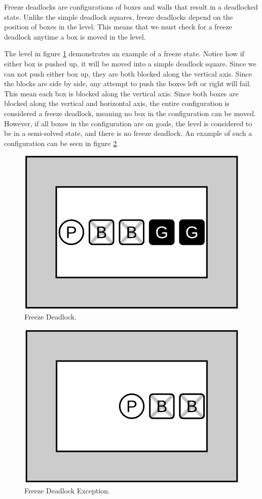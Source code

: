 \documentclass[times, 10pt,twocolumn]{article}
\begin{document}

Freeze deadlocks are configurations of boxes and walls that result in a deadlocked state. Unlike the simple deadlock squares, freeze deadlocks depend on the position of boxes in the level. This means that we must check for a freeze deadlock anytime a box is moved in the level. 

The level in figure \ref{fig:f} demonstrates an example of a freeze state. Notice how if either box is pushed up, it will be moved into a simple deadlock square. Since we can not push either box up, they are both blocked along the vertical axis. Since the blocks are side by side, any attempt to push the boxes left or right will fail. This mean each box is blocked along the vertical axis. Since both boxes are blocked along the vertical and horizontal axis, the entire configuration is considered a freeze deadlock, meaning no box in the configuration can be moved. However, if all boxes in the configuration are on goals, the level is considered to be in a semi-solved state, and there is no freeze deadlock. An example of such a configuration can be seen in figure \ref{fig:fok}.

\begin{figure}[h] 
  \centering
     \includegraphics[width=0.5\linewidth]{images/freeze_deadlock.png}
  \caption{Freeze Deadlock.}
  \label{fig:f}
\end{figure}

\begin{figure}[h] 
  \centering
     \includegraphics[width=0.5\linewidth]{images/freeze_deadlock_ok.png}
  \caption{Freeze Deadlock Exception.}
  \label{fig:fok}
\end{figure}
\end{document}

